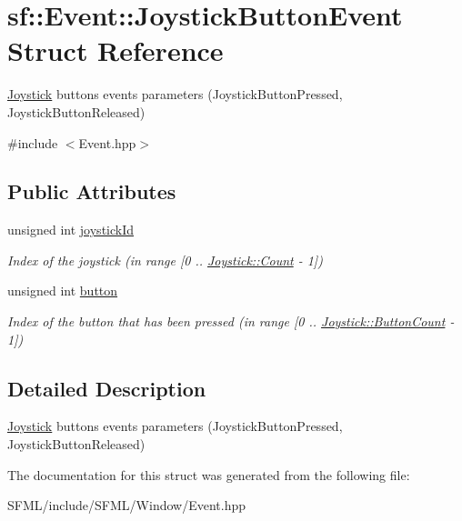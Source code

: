 \hypertarget{structsf_1_1_event_1_1_joystick_button_event}{}\section{sf\+:\+:Event\+:\+:Joystick\+Button\+Event Struct Reference}
\label{structsf_1_1_event_1_1_joystick_button_event}


\mbox{\hyperlink{classsf_1_1_joystick}{Joystick}} buttons events parameters (Joystick\+Button\+Pressed, Joystick\+Button\+Released)  




{\ttfamily \#include $<$Event.\+hpp$>$}

\subsection*{Public Attributes}
\begin{DoxyCompactItemize}
\item 
\mbox{\label{structsf_1_1_event_1_1_joystick_button_event_a2f80ecdb964a5ae0fc30726a404c41ec}} 
unsigned int \mbox{\hyperlink{structsf_1_1_event_1_1_joystick_button_event_a2f80ecdb964a5ae0fc30726a404c41ec}{joystick\+Id}}
\begin{DoxyCompactList}\small\item\em Index of the joystick (in range \mbox{[}0 .. \mbox{\hyperlink{classsf_1_1_joystick_aee00dd432eacd8369d279b47c3ab4cc5a6e0a2a95bc1da277610c04d80f52715e}{Joystick\+::\+Count}} -\/ 1\mbox{]}) \end{DoxyCompactList}\item 
\mbox{\label{structsf_1_1_event_1_1_joystick_button_event_a6412e698a2f7904c5aa875a0d1b34da4}} 
unsigned int \mbox{\hyperlink{structsf_1_1_event_1_1_joystick_button_event_a6412e698a2f7904c5aa875a0d1b34da4}{button}}
\begin{DoxyCompactList}\small\item\em Index of the button that has been pressed (in range \mbox{[}0 .. \mbox{\hyperlink{classsf_1_1_joystick_aee00dd432eacd8369d279b47c3ab4cc5a2f1b8a0a59f2c12a4775c0e1e69e1816}{Joystick\+::\+Button\+Count}} -\/ 1\mbox{]}) \end{DoxyCompactList}\end{DoxyCompactItemize}


\subsection{Detailed Description}
\mbox{\hyperlink{classsf_1_1_joystick}{Joystick}} buttons events parameters (Joystick\+Button\+Pressed, Joystick\+Button\+Released) 

\begin{DoxyVerb}\end{DoxyVerb}
 

The documentation for this struct was generated from the following file\+:\begin{DoxyCompactItemize}
\item 
S\+F\+M\+L/include/\+S\+F\+M\+L/\+Window/Event.\+hpp\end{DoxyCompactItemize}
